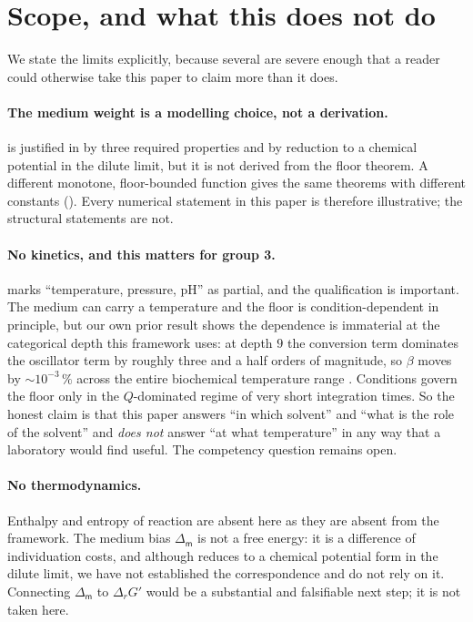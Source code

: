 \documentclass[11pt,twocolumn,a4paper]{article}
\theoremstyle{thmstyle}
\theoremstyle{definition}
\theoremstyle{remark}
\newcommand{\flo}{\beta}
\newcommand{\med}{\mathsf{m}}
\begin{document}
\section{Scope, and what this does not do}
\label{sec:scope}

We state the limits explicitly, because several are severe enough that a
reader could otherwise take this paper to claim more than it does.

\paragraph{The medium weight is a modelling choice, not a derivation.}
 is justified in  by three
required properties and by reduction to a chemical potential in the dilute
limit, but it is not derived from the floor theorem. A different
monotone, floor-bounded function gives the same theorems with different
constants (). Every numerical statement in this paper is
therefore illustrative; the structural statements are not.

\paragraph{No kinetics, and this matters for group 3.}
 marks ``temperature, pressure, pH'' as partial, and
the qualification is important. The medium can carry a temperature and the
floor is condition-dependent in principle, but our own prior result shows
the dependence is immaterial at the categorical depth this framework
uses: at depth $9$ the conversion term dominates the oscillator term by
roughly three and a half orders of magnitude, so $\flo$ moves by
$\sim\!10^{-3}\,\%$ across the entire biochemical temperature range
\citep{sachikonye2026pingpong}. Conditions govern the floor only in the
$Q$-dominated regime of very short integration times. So the honest claim
is that this paper answers ``in which solvent'' and ``what is the role of
the solvent'' and \emph{does not} answer ``at what temperature'' in any
way that a laboratory would find useful. The competency question remains
open.

\paragraph{No thermodynamics.} Enthalpy and entropy of reaction are absent
here as they are absent from the framework. The medium bias
$\Delta_{\med}$ is not a free energy: it is a difference of individuation
costs, and although  reduces to a chemical
potential form in the dilute limit, we have not established the
correspondence and do not rely on it. Connecting $\Delta_{\med}$ to
$\Delta_r G'$ \citep{noor2013thermodynamics,beard2007thermo} would be a
substantial and falsifiable next step; it is not taken here.
\end{document}
